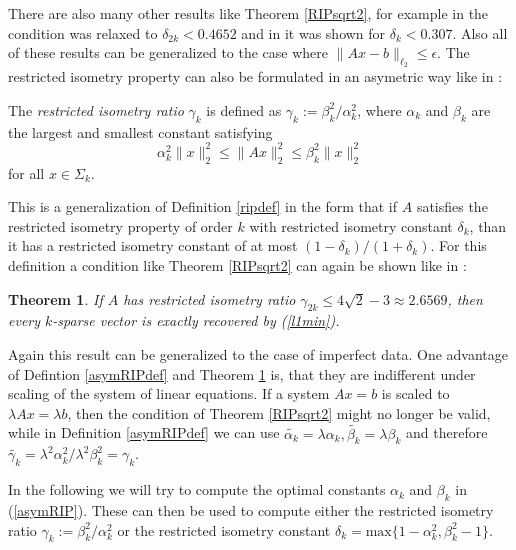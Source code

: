 \documentclass[a4paper,11pt,1p]{elsarticle}
\newtheorem{thm}{Theorem}
\begin{document}
There are also many other results like Theorem \ref{RIPsqrt2}, for example in \cite{fou10} the condition was relaxed to $\delta_{2k} < 0.4652$ and in \cite{CWX10} it was shown for $\delta_k < 0.307$. Also all of these results can be
generalized to the case where $\|Ax - b\|_{\ell_2} \leq \epsilon$. The restricted isometry property can also be formulated in an asymetric way like in \cite{FL09}:

\begin{rmk} \label{asymRIPdef}
The \emph{restricted isometry ratio} $\gamma_k$ is defined as $\gamma_k := \beta_k^2 / \alpha_k^2$, where $\alpha_k$ and $\beta_k$ are the largest and smallest constant satisfying
\begin{equation}\label{asymRIP}
   \alpha_k^2\|x\|_2^2 \leq \|Ax\|_2^2 \leq \beta_k^2\|x\|_2^2
\end{equation}
for all $x \in \Sigma_k$.
\end{rmk}

This is a generalization of Definition \ref{ripdef} in the form that if $A$ satisfies the restricted isometry property of order $k$ with restricted isometry constant $\delta_k$, than it has a restricted isometry constant of at most 
$(1 - \delta_k) / (1 + \delta_k)$. For this definition a condition like Theorem \ref{RIPsqrt2} can again be shown like in \cite{FL09}:

\begin{thm} \label{asymRIPtheorem}
If $A$ has restricted isometry ratio $\gamma_{2k} \leq 4 \sqrt{2} - 3 \approx 2.6569$, then every $k$-sparse vector is exactly recovered by (\ref{l1min}). 
\end{thm}

Again this result can be generalized to the case of imperfect data. One advantage of Defintion \ref{asymRIPdef} and Theorem \ref{asymRIPtheorem} is, that they are indifferent under scaling of the system of linear equations. If a system
$Ax=b$ is scaled to $\lambda Ax = \lambda b$, then the condition of Theorem \ref{RIPsqrt2} might no longer be valid, while in Definition \ref{asymRIPdef} we can use $\tilde{\alpha_k} = \lambda \alpha_k, \tilde{\beta_k} = \lambda \beta_k$
and therefore $\tilde{\gamma_k} = \lambda^2 \alpha_k^2 / \lambda^2
\beta_k^2 = \gamma_k$.

In the following we will try to compute the optimal constants $\alpha_k$ and $\beta_k$ in (\ref{asymRIP}). These can then be used to compute either the restricted isometry ratio $\gamma_k := \beta_k^2 / \alpha_k^2$ or the restricted
isometry constant $\delta_k = \text{max} \{ 1 - \alpha_k^2, \beta_k^2 - 1 \}$.
\end{document}
